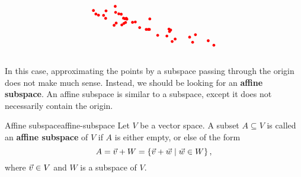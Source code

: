 \documentclass{ximera}
\begin{document}
\begin{equation*}
\begin{tikzpicture}[baseline=-0.5ex, scale=0.8]
    \fill[color=red] (2.60,1.00) circle (0.075);
    \fill[color=red] (-0.57,2.42) circle (0.075);
    \fill[color=red] (2.44,0.87) circle (0.075);
    \fill[color=red] (1.67,1.20) circle (0.075);
    \fill[color=red] (2.27,1.53) circle (0.075);
    \fill[color=red] (-1.48,2.27) circle (0.075);
    \fill[color=red] (-0.65,1.73) circle (0.075);
    \fill[color=red] (3.53,0.83) circle (0.075);
    \fill[color=red] (0.00,2.10) circle (0.075);
    \fill[color=red] (0.03,2.06) circle (0.075);
    \fill[color=red] (-0.40,2.34) circle (0.075);
    \fill[color=red] (0.48,1.91) circle (0.075);
    \fill[color=red] (-0.59,2.74) circle (0.075);
    \fill[color=red] (0.71,1.61) circle (0.075);
    \fill[color=red] (-0.04,1.88) circle (0.075);
    \fill[color=red] (0.33,1.89) circle (0.075);
    \fill[color=red] (4.66,0.67) circle (0.075);
    \fill[color=red] (3.68,1.23) circle (0.075);
    \fill[color=red] (1.06,1.51) circle (0.075);
    \fill[color=red] (-0.08,2.08) circle (0.075);
    \fill[color=red] (-0.24,1.75) circle (0.075);
    \fill[color=red] (4.36,0.91) circle (0.075);
    \fill[color=red] (1.17,1.51) circle (0.075);
    \fill[color=red] (1.25,2.07) circle (0.075);
    \fill[color=red] (2.36,1.48) circle (0.075);
    \fill[color=red] (-1.21,2.26) circle (0.075);
    \fill[color=red] (-0.13,1.83) circle (0.075);
    \fill[color=red] (1.23,1.51) circle (0.075);
    \fill[color=red] (2.30,1.40) circle (0.075);
    \fill[color=red] (-1.08,2.50) circle (0.075);
    \fill[color=red] (-1.62,2.33) circle (0.075);
    \fill[color=red] (-0.27,2.32) circle (0.075);
    \fill[color=red] (-1.75,2.52) circle (0.075);
    \fill[color=red] (3.37,1.10) circle (0.075);
    \fill[color=red] (-1.10,2.10) circle (0.075);
    \fill[color=red] (-0.54,1.85) circle (0.075);
    \fill[color=red] (2.16,1.16) circle (0.075);
    \fill[color=red] (-0.15,2.11) circle (0.075);
  \end{tikzpicture}
\end{equation*}
In this case, approximating the points by a subspace passing through
the origin does not make much sense. Instead, we should be looking for
an \textbf{affine subspace}. An affine subspace is similar to a
subspace, except it does not necessarily contain the origin.

\begin{definition}{Affine subspace}{affine-subspace}
  Let $V$ be a vector space. A subset $A\subseteq V$ is called an
  \textbf{affine subspace}%
   of $V$ if $A$ is either empty, or else of
  the form
  \begin{equation*}
    A = \vec{v} + W = \left\{\vec{v}+\vec{w} \mid \vec{w}\in W\right\},
  \end{equation*}
  where $\vec{v}\in V$ and $W$ is a subspace of\/ $V$.
\end{definition}
\end{document}

